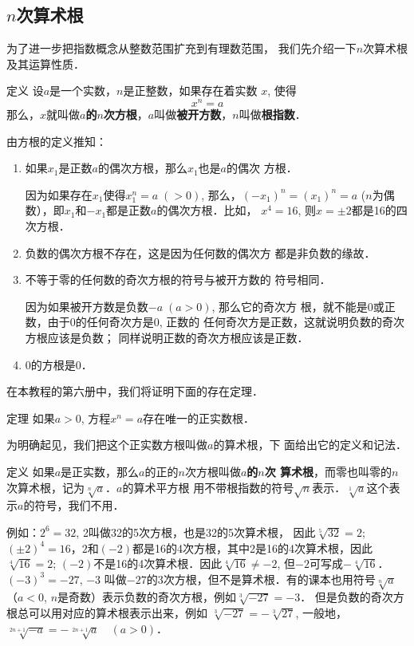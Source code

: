 \subsection{$n$次算术根}
为了进一步把指数概念从整数范围扩充到有理数范围，
我们先介绍一下$n$次算术根及其运算性质．

\begin{blk}{定义}
 设$a$是一个实数，$n$是正整数，如果存在着实数
$x$, 使得
$$x^n=a$$
那么，$x$就叫做\textbf{$a$的$n$次方根}，$a$叫做\textbf{被开方数}，$n$叫做\textbf{根指数}．   
\end{blk}
 
由方根的定义推知：
\begin{enumerate}
    \item 如果$x_1$是正数$a$的偶次方根，那么$x_1$也是$a$的偶次
    方根．

    因为如果存在$x_1$使得$x_1^n=a\; (>0)$, 那么，$(-x_1)^n=(x_1)^n=a$ ($n$为偶数），即$x_1$和$-x_1$都是正数$a$的偶次方根．比如，
$x^4=16$, 则$x=\pm 2$都是16的四次方根．
\item 负数的偶次方根不存在，这是因为任何数的偶次方
都是非负数的缘故．
\item 不等于零的任何数的奇次方根的符号与被开方数的
符号相同．

因为如果被开方数是负数$-a\; (a>0)$, 那么它的奇次方
根，就不能是0或正数，由于0的任何奇次方是0, 正数的
任何奇次方是正数，这就说明负数的奇次方根应该是负数；
同样说明正数的奇次方根应该是正数．
\item 0的方根是0．
\end{enumerate}

在本教程的第六册中，我们将证明下面的存在定理．


\begin{blk}{定理}
    如果$a>0$, 方程$x^n=a$存在唯一的正实数根．
\end{blk}

为明确起见，我们把这个正实数方根叫做$a$的算术根，下
面给出它的定义和记法．


\begin{blk}{定义}
    如果$a$是正实数，那么$a$的正的$n$次方根叫做\textbf{$a$的$n$次
算术根}，而零也叫零的$n$次算术根，记为$\sqrt[n]{a}$．$a$的算术平方根
用不带根指数的符号$\sqrt{n}$表示．$\sqrt[1]{a}$这个表示$a$的符号，我们不用．
\end{blk}

例如：$2^6=32$, 2叫做32的5次方根，也是32的5次算术根，
因此$\sqrt[5]{32}=2$; $(\pm 2)^4=16$，$2$和$(-2)$都是16的4次方根，其中2是16的4次算术根，因此$\sqrt[4]{16}=2$; $(-2)$不是16的4次算术根．因此$\sqrt[4]{16}\ne -2$, 但$-2$可写成$-\sqrt[4]{16}$．$(-3)^3=-27$, $-3$
叫做$-27$的3次方根，但不是算术根．有的课本也用符号$\sqrt[n]{a}$
（$a<0$, $n$是奇数）表示负数的奇次方根，例如$\sqrt[3]{-27}=-3$．
但是负数的奇次方根总可以用对应的算术根表示出来，例如
$\sqrt[3]{-27}=-\sqrt[3]{27}$, 一般地，$\sqrt[2n+1]{-a}=-\sqrt[2n+1]{a}\quad  (a>0)$．

